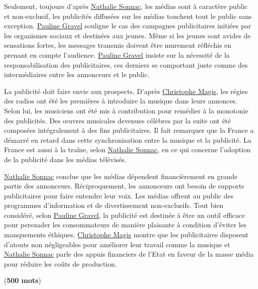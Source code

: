 \documentclass[11pt]{article}
\begin{document}
Seulement, toujours d’après \underline{Nathalie Sonnac}, les médias sont à caractère public et non-exclusif, les publicités diffusées sur les médias touchent tout le public sans exception. \underline{Pauline Gravel} souligne le cas des campagnes publicitaires initiées par les organismes sociaux et destinées aux jeunes. Même si les jeunes sont avides de sensations fortes, les messages transmis doivent être murement réfléchis en prenant en compte l’audience. \underline{Pauline Gravel} insiste sur la nécessité de la responsabilisation des publicitaires, ces derniers se comportant juste comme des intermédiaires entre les annonceurs et le public.

La publicité doit faire envie aux prospects. D’après \underline{Christophe Magis}, les régies des radios ont été les premières à introduire la musique dans leurs annonces. Selon lui, les musiciens ont été mis à contribution pour remédier à la monotonie des publicités. Des \oe uvres musicales devenues célèbres par la suite ont été composées intégralement à des fins publicitaires. Il fait remarquer que la France a démarré en retard dans cette synchronisation entre la musique et la publicité. La France est aussi à la traîne, selon \underline{Nathalie Sonnac}, en ce qui concerne l’adoption de la publicité dans les médias télévisés.

\underline{Nathalie Sonnac} conclue que les médias dépendent financièrement en grande partie des annonceurs. Réciproquement, les annonceurs ont besoin de supports publicitaires pour faire entendre leur voix. Les médias offrent au public des programmes d'information et de divertissement non-exclusifs.
 Tout bien considéré, selon \underline{Pauline Gravel}, la publicité est destinée à être un outil efficace pour persuader les consommateurs de manière plaisante à condition d'éviter les manquements éthiques. \underline{Christophe Magis} montre que les publicitaires disposent d’atouts non négligeables pour améliorer leur travail comme la musique et \underline{Nathalie Sonnac} parle des appuis financiers de l’Etat en faveur de la masse média pour réduire les coûts de production.

(\textbf{500 mots})

\newpage
\end{document}
